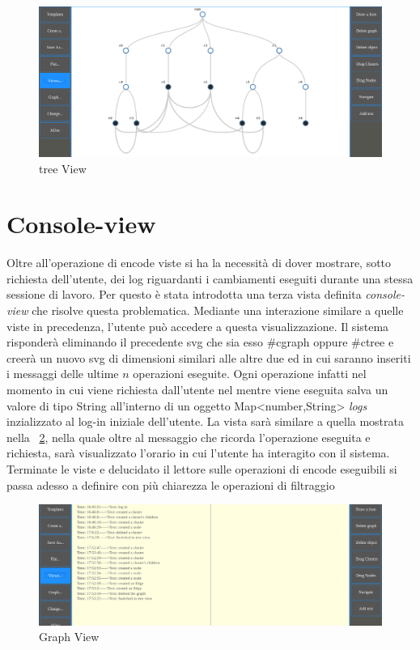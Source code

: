 {\begin{figure}[!htb]
	\begin{center}
		\includegraphics[width=1 \linewidth]{figure/treeView}
	\end{center}
	\caption{tree View\label{fig:treeView}}
\end{figure}
\section{Console-view}
Oltre all'operazione di encode viste si ha la necessità di dover mostrare, sotto richiesta dell'utente, dei log riguardanti i cambiamenti eseguiti durante una stessa sessione di lavoro. Per questo è stata introdotta una terza vista definita \textit{console-view} che risolve questa problematica.
Mediante una interazione similare a quelle viste in precedenza, l'utente può accedere a questa visualizzazione. Il sistema risponderà eliminando il precedente svg che sia esso \#cgraph oppure \#ctree e creerà un nuovo svg di dimensioni similari alle altre due ed in cui saranno inseriti i messaggi delle ultime $n$ operazioni eseguite. Ogni operazione infatti nel momento in cui viene richiesta dall'utente nel mentre viene eseguita salva un valore di tipo String all'interno di un oggetto Map<number,String> \textit{logs} inzializzato al log-in iniziale dell'utente.
La vista sarà similare a quella mostrata nella \figurename~\ref{fig:consoleView}, nella quale oltre al messaggio che ricorda l'operazione eseguita e richiesta, sarà visualizzato l'orario in cui l'utente ha interagito con il sistema. Terminate le viste e delucidato il lettore sulle operazioni di encode eseguibili si passa adesso a definire con più chiarezza le operazioni di filtraggio
\begin{figure}[!htb]
	\begin{center}
		\includegraphics[width=1 \linewidth]{figure/consoleView}
	\end{center}
	\caption{Graph View\label{fig:consoleView}}
\end{figure}

}

